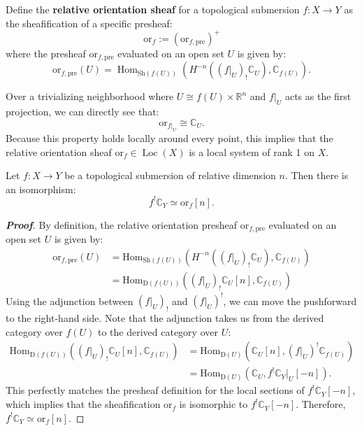 \begin{definition}
Define the \textbf{relative orientation sheaf} for a topological submersion $f \colon X \longrightarrow Y$ as the sheafification of a specific presheaf:
\begin{equation*}
    \text{or}_f := (\text{or}_{f, \text{pre}})^+
\end{equation*}
where the presheaf $\text{or}_{f, \text{pre}}$ evaluated on an open set $U$ is given by:
\begin{equation*}
    \text{or}_{f, \text{pre}}(U) = \operatorname{Hom}_{\text{Sh}(f(U))} \left( H^{-n}((f|_U)_! \mathbb{C}_U), \mathbb{C}_{f(U)} \right).
\end{equation*}
\end{definition}

Over a trivializing neighborhood where $U \cong f(U) \times \mathbb{R}^n$ and $f|_U$ acts as the first projection, we can directly see that:
\begin{equation*}
    \text{or}_{f|_U} \cong \mathbb{C}_U.
\end{equation*}
Because this property holds locally around every point, this implies that the relative orientation sheaf $\text{or}_f \in \operatorname{Loc}(X)$ is a local system of rank 1 on $X$.

\begin{lemma}
Let $f \colon X \longrightarrow Y$ be a topological submersion of relative dimension $n$. Then there is an isomorphism:
\begin{equation*}
    f^! \mathbb{C}_Y \simeq \text{or}_f[n].
\end{equation*}
\end{lemma}

\begin{proof}[\textbf{Proof}]
By definition, the relative orientation presheaf $\text{or}_{f, \text{pre}}$ evaluated on an open set $U$ is given by:
\begin{align*}
\mathrm{or}_{f,\text{pre}}(U) &= \mathrm{Hom}_{\mathrm{Sh}(f(U))} \left( H^{-n}((f|_U)_!\mathbb{C}_U), \mathbb{C}_{f(U)} \right) \\
&= \mathrm{Hom}_{\mathrm{D}(f(U))} \left( (f|_U)_!\mathbb{C}_U[n], \mathbb{C}_{f(U)} \right)
\end{align*}
Using the adjunction between $(f|_U)_!$ and $(f|_U)^!$, we can move the pushforward to the right-hand side. Note that the adjunction takes us from the derived category over $f(U)$ to the derived category over $U$:
\begin{align*}
\mathrm{Hom}_{\mathrm{D}(f(U))} \left( (f|_U)_!\mathbb{C}_U[n], \mathbb{C}_{f(U)} \right) &= \mathrm{Hom}_{\mathrm{D}(U)} \left( \mathbb{C}_U[n], (f|_U)^!\mathbb{C}_{f(U)} \right) \\
&= \mathrm{Hom}_{\mathrm{D}(U)} \left( \mathbb{C}_U, f^!\mathbb{C}_Y|_U[-n] \right).
\end{align*}
This perfectly matches the presheaf definition for the local sections of $f^! \mathbb{C}_Y[-n]$, which implies that the sheafification $\text{or}_f$ is isomorphic to $f^! \mathbb{C}_Y[-n]$. Therefore, $f^! \mathbb{C}_Y \simeq \text{or}_f[n]$.
\end{proof}

